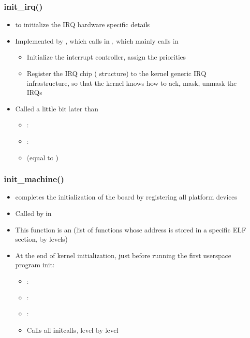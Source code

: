 \begin{frame}
  \frametitle{init\_irq()}
  \begin{itemize}
  \item {} to initialize the IRQ hardware specific
    details
  \item Implemented by , which calls
     in ,
    which mainly calls  in 
    \begin{itemize}
    \item Initialize the interrupt controller, assign the priorities
    \item Register the IRQ chip ( structure) to the
      kernel generic IRQ infrastructure, so that the kernel knows how
      to ack, mask, unmask the IRQs
    \end{itemize}
  \item Called a little bit later than 
    \begin{itemize}
    \item {}: 
    \item {}: 
    \item {} (equal to )
    \end{itemize}
  \end{itemize}
\end{frame}

\begin{frame}
  \frametitle{init\_machine()}
  \begin{itemize}
  \item {} completes the initialization of the
    board by registering all platform devices
  \item Called by  in
  \item This function is an  (list of functions
    whose address is stored in a specific ELF section, by levels)
  \item At the end of kernel initialization, just before running the
    first userspace program init:
    \begin{itemize}
    \item {}: 
    \item {}: 
    \item {}: 
    \item Calls all initcalls, level by level
    \end{itemize}
  \end{itemize}
\end{frame}


